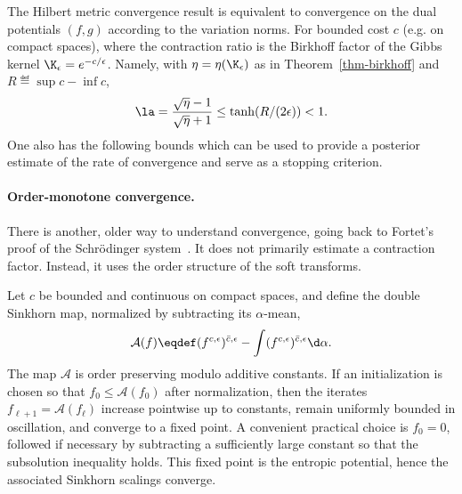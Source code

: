 The Hilbert metric convergence result is equivalent to convergence on the dual potentials $(f,g)$ according to the variation norms. For bounded cost $c$ (e.g. on compact spaces),
where the contraction ratio is the Birkhoff factor of the Gibbs kernel $\K_\epsilon=e^{-c/\epsilon}$. Namely, with $\eta=\eta(\K_\epsilon)$ as in Theorem~\ref{thm-birkhoff} and $R\eqdef\sup c-\inf c$,
\[
	\la=\frac{\sqrt{\eta}-1}{\sqrt{\eta}+1}
	\leq
	\tanh(R/(2\epsilon))<1 .
\]
One also has the following bounds
which can be used to provide a posterior estimate of the rate of convergence and serve as a stopping criterion.


\paragraph{Order-monotone convergence.}

There is another, older way to understand convergence, going back to Fortet's proof of the Schr\"odinger system~\cite{fortet1940schrodinger,essid2019fortet,leonard2019fortet}. It does not primarily estimate a contraction factor. Instead, it uses the order structure of the soft transforms.

\begin{prop}\label{prop-fortet-monotone}
	Let $c$ be bounded and continuous on compact spaces, and define the double Sinkhorn map, normalized by subtracting its $\alpha$-mean,
	\[
		\mathcal A(f) \eqdef
		(f^{c,\epsilon})^{\bar c,\epsilon}
		-\int (f^{c,\epsilon})^{\bar c,\epsilon}\d\alpha.
	\]
	The map $\mathcal A$ is order preserving modulo additive constants. If an initialization is chosen so that $f_0\leq \mathcal A(f_0)$ after normalization, then the iterates $f_{\ell+1}=\mathcal A(f_\ell)$ increase pointwise up to constants, remain uniformly bounded in oscillation, and converge to a fixed point. A convenient practical choice is $f_0=0$, followed if necessary by subtracting a sufficiently large constant so that the subsolution inequality holds. This fixed point is the entropic potential, hence the associated Sinkhorn scalings converge.
\end{prop}

